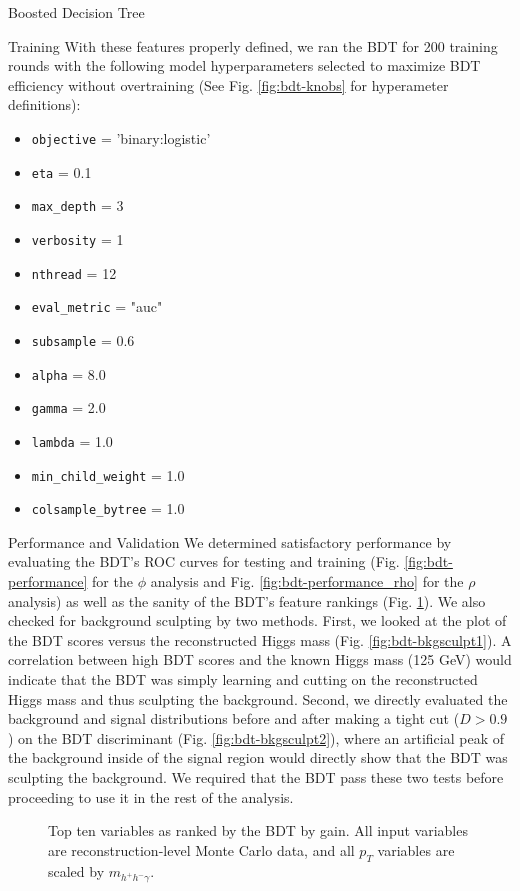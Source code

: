 \begin{section}{Boosted Decision Tree}
\begin{subsection}{Training}
With these features properly defined, we ran the BDT for 200 training rounds with the following model hyperparameters selected to maximize BDT efficiency without overtraining (See Fig. \ref{fig:bdt-knobs} for hyperameter definitions):
\begin{itemize}
    \item \verb|objective| = 'binary:logistic'
    \item \verb|eta| = 0.1
    \item \verb|max_depth| = 3
    \item \verb|verbosity| = 1
    \item \verb|nthread| = 12
    \item \verb|eval_metric| = "auc"
    \item \verb|subsample| = 0.6
    \item \verb|alpha| = 8.0
    \item \verb|gamma| = 2.0
    \item \verb|lambda| = 1.0
    \item \verb|min_child_weight| = 1.0
    \item \verb|colsample_bytree| = 1.0
\end{itemize}

\end{subsection}
\begin{subsection}{Performance and Validation}\label{perf-and-val}
We determined satisfactory performance by evaluating the BDT's ROC curves for testing and training (Fig. \ref{fig:bdt-performance} for the $\phi$ analysis and Fig. \ref{fig:bdt-performance_rho} for the $\rho$ analysis) as well as the sanity of the BDT's feature rankings (Fig. \ref{fig:bdt-vars}). We also checked for background sculpting by two methods. First, we looked at the plot of the BDT scores versus the reconstructed Higgs mass (Fig. \ref{fig:bdt-bkgsculpt1}). A correlation between high BDT scores and the known Higgs mass (125 GeV) would indicate that the BDT was simply learning and cutting on the reconstructed Higgs mass and thus sculpting the background. Second, we directly evaluated the background and signal distributions before and after making a tight cut ($D > 0.9$) on the BDT discriminant (Fig. \ref{fig:bdt-bkgsculpt2}), where an artificial peak of the background inside of the signal region would directly show that the BDT was sculpting the background. We required that the BDT pass these two tests before proceeding to use it in the rest of the analysis.

\begin{figure}[htb]
\begin{center}
\subfloat      {
\scalebox{.75}[0.75]{}
}\quad
\subfloat      {
\scalebox{.75}[0.75]{}
}
\end{center}
\caption{Top ten variables as ranked by the BDT by gain. All input variables are reconstruction-level Monte Carlo data, and all $p_{T}$ variables are scaled by $m_{h^{+}h^{-}\gamma}.$}
\label{fig:bdt-vars}
\end{figure}


\end{subsection}
\end{section}
